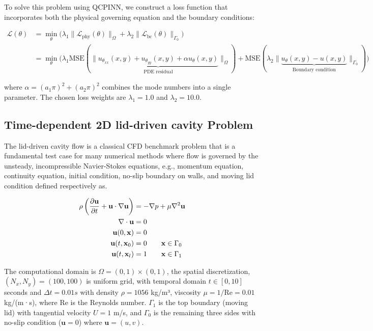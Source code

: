 \noindent  To solve this problem using QCPINN, we construct a loss function that incorporates both the physical governing equation and the boundary conditions:

\begin{equation}
    \begin{split}
\mathcal{L}(\theta) &= \underset{\theta}{\min} \big( \lambda_1\|\mathcal{L}_{\text{phy}}(\theta)\|_{\Omega} + \lambda_2 \|\mathcal{L}_{\text{bc}}(\theta)\|_{\Gamma_0} \big) \\
&= \underset{\theta}{\min} \big( \lambda_1 \text{MSE}(\| \underbrace{u_{\theta_{xx}}(x,y) + u_{\theta_{yy}}(x,y) + \alpha u_{\theta}(x,y)}_{\text{PDE residual}}\|_{\Omega}) + \text{MSE}(\lambda_2 \| \underbrace{u_{\theta}(x,y) - u(x,y)}_{\text{Boundary condition}}\|_{\Gamma_0}) \big)
    \end{split} 
    \label{eq:Helmholtz_loss}
\end{equation}

 
\noindent where $\alpha = (a_1\pi)^2 + (a_2\pi)^2$ combines the mode numbers into a single parameter. The chosen loss weights are $\lambda_1 = 1.0$  and $\lambda_2 = 10.0$.


\subsection{Time-dependent 2D lid-driven cavity Problem}
The lid-driven cavity flow is a classical CFD benchmark problem that is a fundamental test case for many numerical methods where flow is governed by the unsteady, incompressible Navier-Stokes equations, e.g.,  momentum equation, continuity equation, initial condition, no-slip boundary on walls, and moving lid condition defined respectively as.


\begin{align}
    \rho \left(\frac{\partial \mathbf{u}}{\partial t} + \mathbf{u} \cdot \nabla \mathbf{u}\right) &= - \nabla p + \mu \nabla^2 \mathbf{u} \label{eq:Cavity}\\
    \nabla \cdot \mathbf{u} &= 0  \notag\\
    \mathbf{u}(0 , \mathbf{x}) &= 0 \notag \\
    \mathbf{u}(t , \mathbf{x}_0) &= 0 \qquad \mathbf{x} \in \Gamma_0  \notag\\
    \mathbf{u}(t , \mathbf{x}_l) &= 1  \qquad \mathbf{x} \in \Gamma_1 \notag
\end{align}
 

\noindent The computational domain is $\Omega = (0, 1) \times (0, 1)$, 
the spatial discretization, $(N_x, N_y) = (100, 100)$ is uniform grid, with temporal domain $t \in [0, 10]$ seconds and $\Delta t = 0.01s$ with density $\rho = 1056$ kg/m³, 
viscosity $\mu = 1/\mathrm{Re} = 0.01$ kg/(m·s), where Re is the Reynolds number.
$\Gamma_1$ is the top boundary (moving lid) with tangential velocity $U = 1$ m/s, and $\Gamma_0$ is the remaining three sides with no-slip condition ($\mathbf{u} = 0$) where $ \mathbf{u}=(u,v)$.

